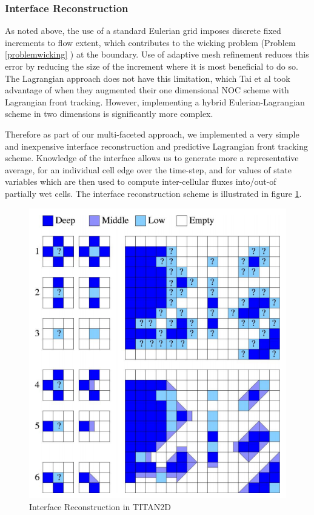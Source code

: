 \documentclass[letterpaper,10pt]{article}
\begin{document}
\subsubsection{Interface Reconstruction} \label{Interfacerecon}
As noted above, the use of a standard Eulerian grid imposes discrete 
fixed increments to flow extent, which contributes to the wicking problem
(Problem \ref{problemwicking} ) at the 
boundary.  Use of adaptive mesh refinement 
reduces this error by reducing the size of the increment where it is
most beneficial to do so.  The Lagrangian approach does not have this 
limitation, which Tai et al \cite{Tai2002} took advantage
of when they augmented their one dimensional NOC scheme with 
Lagrangian front tracking.  However, implementing a hybrid 
Eulerian-Lagrangian scheme in two dimensions is significantly more 
complex.  \newline

Therefore as part of our multi-faceted approach, we implemented a very 
simple and inexpensive interface reconstruction and predictive 
Lagrangian front tracking scheme.  Knowledge of the interface allows
us to generate more a representative average, for an individual cell edge 
over the time-step, and for values of state variables which are then used to 
compute inter-cellular fluxes into/out-of partially wet cells.  The 
interface reconstruction scheme is illustrated in figure \ref{interface}.\newline

\begin{figure}[!h]
\centerline{\includegraphics[scale=0.6]{IMAGES/flux.png}}
\caption{Interface Reconstruction in TITAN2D}
\label{interface}
\end{figure} 
\end{document}
